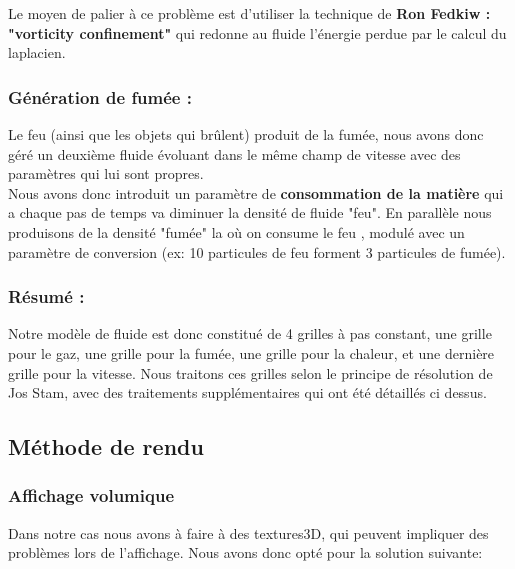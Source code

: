 \documentclass[a4paper,10pt]{article}
\begin{document}
Le moyen de palier à ce problème est d'utiliser la technique de \textbf{Ron Fedkiw
: "vorticity confinement"} qui redonne au fluide l'énergie perdue par le
calcul du laplacien.

\subsubsection{Génération de fumée :}
Le feu (ainsi que les objets qui brûlent) produit de la fumée, nous avons donc géré un
deuxième fluide évoluant dans le même champ de vitesse avec des
paramètres qui lui sont propres.\\

Nous avons donc introduit un paramètre de \textbf{consommation de la
  matière} qui a chaque pas de temps va diminuer la densité de fluide
"feu". En parallèle nous produisons de la densité "fumée" la où on
consume le feu , modulé avec un paramètre de conversion (ex: 10
particules de feu forment 3 particules de fumée).


\subsubsection{Résumé :}
Notre modèle de fluide est donc constitué de 4 grilles à pas constant, une grille pour le gaz,
une grille pour la fumée, une grille pour la chaleur, et une dernière grille pour la vitesse. 
Nous traitons ces grilles selon le principe de résolution de Jos Stam, avec des traitements supplémentaires
qui ont été détaillés  ci dessus.

\subsection{Méthode de rendu}
\subsubsection{Affichage volumique}

Dans notre cas nous avons à faire à des textures3D, qui peuvent impliquer des problèmes lors de l'affichage. Nous avons donc opté pour la solution suivante:\\
\end{document}
